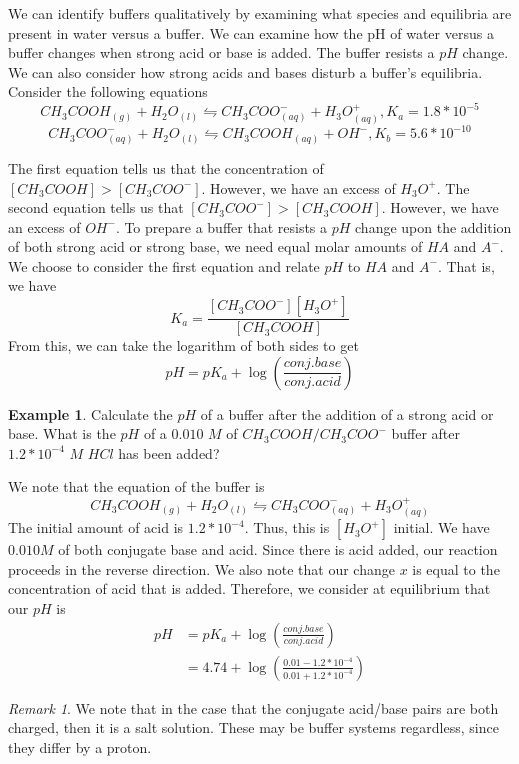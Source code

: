 \documentclass[11pt]{article}
\theoremstyle{plain} %
\theoremstyle{definition}
\theoremstyle{example}
\newtheorem*{example}{Example}
\theoremstyle{remark}
\newtheorem*{remark}{Remark}
\begin{document}
We can identify buffers qualitatively by examining what species and equilibria are present in water versus a buffer. We can examine how the pH of water versus a buffer changes when strong acid or base is added. The buffer resists a $pH$ change. We can also consider how strong acids and bases disturb a buffer's equilibria. 
Consider the following equations 
$$CH_3COOH_{(g)} + H_2O_{(l)} \leftrightharpoons CH_3COO_{(aq)}^- + H_3O_{(aq)}^+, K_a = 1.8*10^{-5}$$
$$CH_3COO_{(aq)}^- + H_2O_{(l)}  \leftrightharpoons CH_3COOH_{(aq)} + OH^- , K_b = 5.6 * 10^{-10}$$

The first equation tells us that the concentration of $[CH_3COOH] > [CH_3COO^-]$. However, we have an excess of $H_3O^+$. The second equation tells us that $[CH_3COO^-] > [CH_3COOH]$. However, we have an excess of $OH^-$. To prepare a buffer that resists a $pH$ change upon the addition of both strong acid or strong base, we need equal molar amounts of $HA$ and $A^-$. We choose to consider the first equation and relate $pH$ to $HA$ and $A^-$. That is, we have 
$$K_a = \frac{\left[CH_3COO^-\right]\left[H_3O^+\right]}{[CH_3COOH]}$$
From this, we can take the logarithm of both sides to get $$pH = pK_a + \log\left(\frac{conj. base}{conj. acid}\right)$$


\begin{example}
Calculate the $pH$ of a buffer after the addition of a strong acid or base. What is the $pH$ of a $0.010$ $M$ of $CH_3COOH/CH_3COO^-$ buffer after $1.2 * 10^{-4}$ $M$ $HCl$ has been added?
\end{example}

We note that the equation of the buffer is $$CH_3COOH_{(g)} + H_2O_{(l)} \leftrightharpoons CH_3COO_{(aq)}^- + H_3O_{(aq)}^+$$ The initial amount of acid is $1.2 * 10^{-4}$. Thus, this is $[H_3O^+]$ initial. We have $0.010M$ of both conjugate base and acid. Since there is acid added, our reaction proceeds in the reverse direction. We also note that our change $x$ is equal to the concentration of acid that is added. Therefore, we consider at equilibrium that our $pH$ is 
\begin{align*}
pH &= pK_a + \log\left(\frac{conj.base}{conj.acid}\right)\\
&= 4.74 + \log\left(\frac{0.01 - 1.2*10^{-4}}{0.01 + 1.2*10^{-4}}\right)
\end{align*}

\begin{remark}
We note that in the case that the conjugate acid/base pairs are both charged, then it is a salt solution. These may be buffer systems regardless, since they differ by a proton. 
\end{remark}
\end{document}
